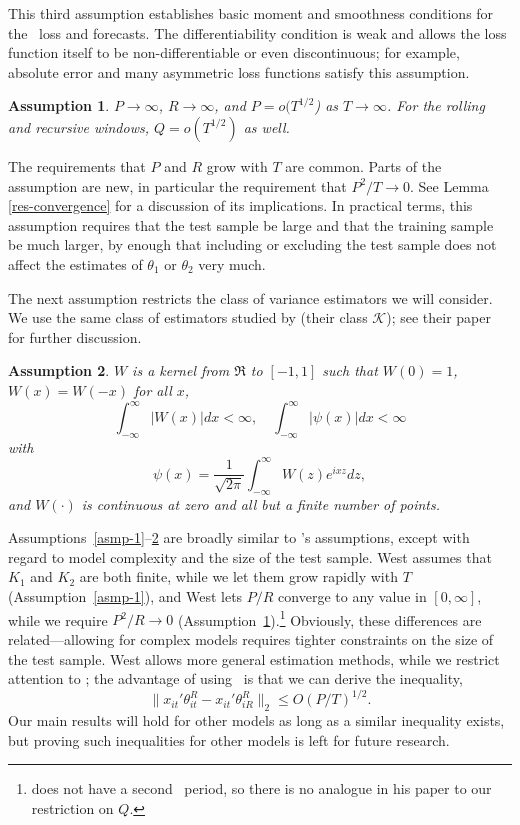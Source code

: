 \documentclass[11pt]{article}
\newtheorem{asmp}{Assumption}
\newcommand{\citepos}[1]{\citeauthor{#1}'s \citeyearpar{#1}}
\begin{document}
This third assumption establishes basic moment and smoothness
conditions for the \oos\ loss and forecasts.  The differentiability
condition is weak and allows the loss function itself to be
non-differentiable or even discontinuous; for example, absolute error
and many asymmetric loss functions satisfy this assumption.

\begin{asmp} \label{asmp-4} $P\to\infty$, $R\to\infty$, and  $P =
  o(T^{1/2}$) as $T \to \infty$.  For the rolling and recursive
  windows, $Q = o(T^{1/2})$ as well.
\end{asmp}

The requirements that $P$ and $R$ grow with $T$ are common.  Parts of
the assumption are new, in particular the requirement that $P^2/T \to
0$.  See Lemma \ref{res-convergence} for a discussion of its
implications.  In practical terms, this assumption requires that the
test sample be large and that the training sample be much larger, by
enough that including or excluding the test sample does not affect the
estimates of $\theta_1$ or $\theta_2$ very much.

The next assumption restricts the class of variance estimators we will
consider.  We use the same class of estimators studied by
\citet{JoD:00} (their class $\mathcal{K}$); see
their paper for further discussion.

\begin{asmp}
  \label{asmp-5} $W$ is a kernel from 
$\Re$ to $[-1,1]$ such that $W(0) = 1$, $W(x) = W(-x)$ for all $x$,
\begin{equation*}
    \int_{-\infty}^{\infty} \lvert W(x) \rvert dx < \infty, \quad
    \int_{-\infty}^{\infty} \lvert \psi(x) \rvert dx < \infty
\end{equation*}
with
\begin{equation*} \psi(x) = \frac1{\sqrt{2\pi}} \int_{-\infty}^{\infty} W(z) e^{ixz}dz,
\end{equation*}
and $W(\cdot)$ is continuous at zero and all but a finite number of
points.
\end{asmp}

Assumptions~\ref{asmp-1}--\ref{asmp-5} are broadly similar to
\citepos{Wes:96} assumptions, except with regard to model complexity
and the size of the test sample.  West assumes that $K_1$ and $K_2$
are both finite, while we let them grow rapidly with $T$
(Assumption~\ref{asmp-1}), and West lets $P/R$ converge to any value
in $[0,\infty]$, while we require $P^2/R \to 0$
(Assumption~\ref{asmp-4}).\footnote{\citet{Wes:96} does not have a
  second \oos\ period, so there is no analogue in his paper to our
  restriction on $Q$.}  Obviously, these differences are
related---allowing for complex models requires tighter constraints on
the size of the test sample.  West allows more general estimation
methods, while we restrict attention to \ols; the advantage of using
\ols\ is that we can derive the inequality, $$\| x_{it}'
\theta_{it}^{R} - x_{it}' \theta_{iR}^R \|_2 \leq O(P/T)^{1/2}.$$  Our
main results will hold for other models as long as a similar
inequality exists, but proving such inequalities for other models is
left for future research.
\end{document}
